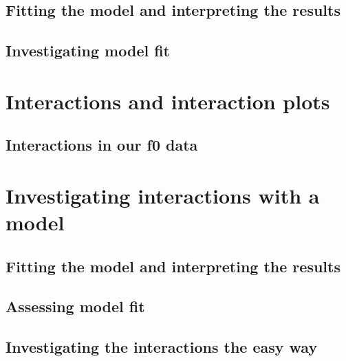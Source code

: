 \documentclass[
]{book}
\begin{document}
\hypertarget{fitting-the-model-and-interpreting-the-results}{%
\subsection{Fitting the model and interpreting the results}\label{fitting-the-model-and-interpreting-the-results}}

\hypertarget{investigating-model-fit}{%
\subsection{Investigating model fit}\label{investigating-model-fit}}

\hypertarget{interactions-and-interaction-plots}{%
\section{Interactions and interaction plots}\label{interactions-and-interaction-plots}}

\hypertarget{interactions-in-our-f0-data}{%
\subsection{Interactions in our f0 data}\label{interactions-in-our-f0-data}}

\hypertarget{investigating-interactions-with-a-model}{%
\section{Investigating interactions with a model}\label{investigating-interactions-with-a-model}}

\hypertarget{fitting-the-model-and-interpreting-the-results-1}{%
\subsection{Fitting the model and interpreting the results}\label{fitting-the-model-and-interpreting-the-results-1}}

\hypertarget{assessing-model-fit}{%
\subsection{Assessing model fit}\label{assessing-model-fit}}

\hypertarget{investigating-the-interactions-the-easy-way}{%
\subsection{Investigating the interactions the easy way}\label{investigating-the-interactions-the-easy-way}}
\end{document}
